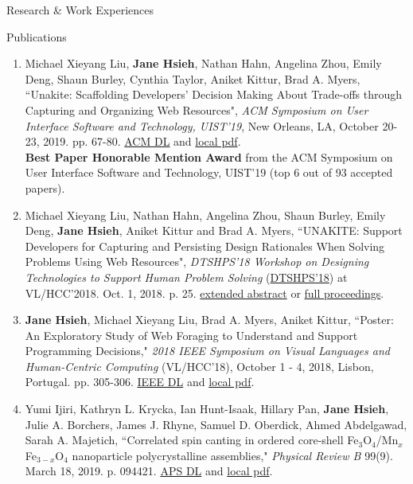 \documentclass{resume}
\begin{document}
\begin{rSection}{Research \& Work Experiences}
\end{rSection}

\begin{rSection}{Publications}
\begin{enumerate}
    \item Michael Xieyang Liu, \textbf{Jane Hsieh}, Nathan Hahn, Angelina Zhou, Emily Deng, Shaun Burley, Cynthia Taylor, Aniket Kittur, Brad A. Myers, ``Unakite: Scaffolding Developers’ Decision Making About Trade-offs through Capturing and Organizing Web Resources", \textit{ACM Symposium on User Interface Software and Technology, UIST'19}, New Orleans, LA, October 20-23, 2019. pp. 67-80. \href{https://dl.acm.org/citation.cfm?id=3347908}{ACM DL} and \href{http://www.cs.cmu.edu/~NatProg/papers/p67-liu-Unakite-UIST.pdf}{local pdf}.\\
    \textbf{Best Paper Honorable Mention Award} from the ACM Symposium on User Interface Software and Technology, UIST'19 (top 6 out of 93 accepted papers). 
    \item Michael Xieyang Liu, Nathan Hahn, Angelina Zhou, Shaun Burley, Emily Deng, \textbf{Jane Hsieh}, Aniket Kittur and Brad A. Myers, ``UNAKITE: Support Developers for Capturing and Persisting Design Rationales When Solving Problems Using Web Resources", \textit{DTSHPS'18 Workshop on Designing Technologies to Support Human Problem Solving} (\href{https://www.cs.washington.edu/dtshps2018/index.html}{DTSHPS'18}) at VL/HCC'2018. Oct. 1, 2018. p. 25. \href{http://www.cs.cmu.edu/~NatProg/papers/DTSHPS%20paper%207%20-%20one-page-summary-with-references%20v2.pdf}{extended abstract} or \href{https://digital.lib.washington.edu/researchworks/bitstream/handle/1773/42857/DTSHPS18-Proceedings-final%20v2.pdf}{full proceedings}.
    \item \textbf{Jane Hsieh}, Michael Xieyang Liu, Brad A. Myers, Aniket Kittur, ``Poster: An Exploratory Study of Web Foraging to Understand and Support Programming Decisions," \textit{2018 IEEE Symposium on Visual Languages and Human-Centric Computing} (VL/HCC'18), October 1 - 4, 2018, Lisbon, Portugal. pp. 305-306. \href{https://ieeexplore.ieee.org/document/8506517}{IEEE DL} and \href{http://www.cs.cmu.edu/~NatProg/papers/p305-hsieh.pdf}{local pdf}.
    \item Yumi Ijiri, Kathryn L. Krycka, Ian Hunt-Isaak, Hillary Pan, \textbf{Jane Hsieh}, Julie A. Borchers, James J. Rhyne, Samuel D. Oberdick, Ahmed Abdelgawad, Sarah A. Majetich, ``Correlated spin canting in ordered core-shell Fe$_3$O$_4$/Mn$_x$Fe$_{3-x}$O$_4$ nanoparticle polycrystalline assemblies," \textit{Physical Review B} 99(9). March 18, 2019. p. 094421. \href{https://journals.aps.org/prb/abstract/10.1103/PhysRevB.99.094421}{APS DL} and \href{https://janeon.github.io/assets/img/PhysRevB.99.094421.pdf}{local pdf}.


\end{enumerate}
\end{rSection}
\end{document}
